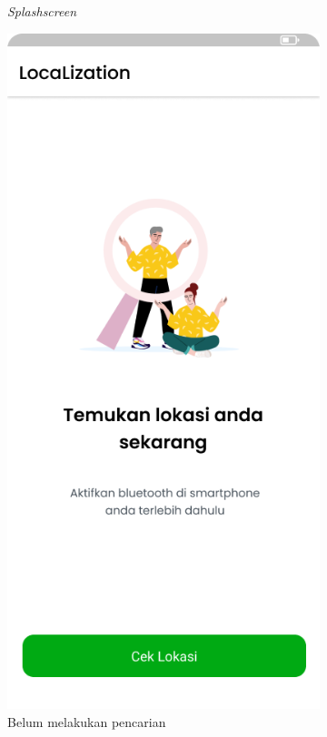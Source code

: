 \begin{enumerate}[a.]
\begin{figure} [H]
\begin{subfigure}{.5\textwidth}
			      \caption{\textit{Splashscreen}}
		      \end{subfigure}
		      \begin{subfigure}{.5\textwidth}
			      \centering
			      \includegraphics[width=.5\linewidth]{gambar/tekancari.png}
			      \caption{Belum melakukan pencarian}
		      \end{subfigure}
		      \vspace{0.5cm}
		      \newline
		      \begin{subfigure}{.5\textwidth}
			      \centering

\end{subfigure}
\end{figure}
\end{enumerate}
